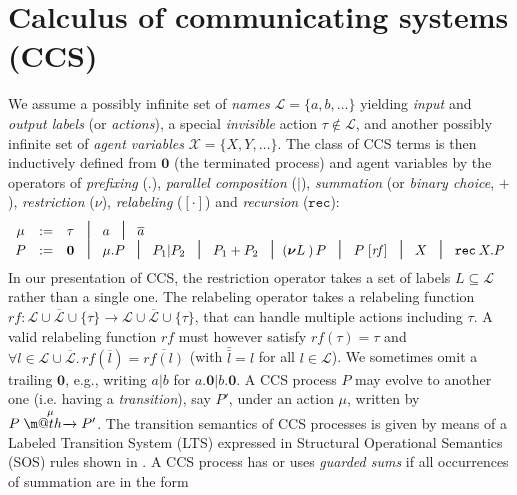 \documentclass[GCNS]{yincog}
\makeatletter
\def \rightarrowfill{$\m@th\mathord{\smash-}\mkern-6mu%
  \cleaders\hbox{$\mkern-2mu\mathord{\smash-}\mkern-2mu$}\hfill
  \mkern-6mu\mathord\rightarrow$}
\theoremstyle{remark}
\theoremstyle{theorem}
\theoremstyle{remark}
\def\nil{{\boldsymbol 0}}
\def\res#1{{\boldsymbol \nu} #1\:}
\newcommand{\outC}[1]{\overline{#1}}
\newcommand{\arr}[1]{\mathrel{\stackrel{{\;\;#1\;\;}}{\mbox{\rightarrowfill}}}}
\def\midd{\; \; \mbox{\Large{$\mid$}}\;\;}
\newcommand{\recu}[2]{\mathtt{rec}\: #1 . #2}
\makeatother
\begin{document}
\section{Calculus of communicating systems (CCS)}
 \label{ss:ccs}

We assume a possibly infinite set of \emph{names}
$\mathscr{L} = \{a, b, \ldots \}$ yielding \emph{input} and
\emph{output labels} (or \emph{actions}), a special \emph{invisible} action
$\tau \notin \mathscr{L}$, and another possibly infinite set of
\emph{agent variables} $\mathscr{X} = \{X, Y, \ldots \}$. The class of CCS
terms is then inductively defined from $\nil $ (the terminated process)
and agent variables by the operators of \emph{prefixing} (.),
\emph{parallel composition} ($|$), \emph{summation} (or
\emph{binary choice}, $+$), \emph{restriction} ($\nu $),
\emph{relabeling} ($[\cdot ]$) and \emph{recursion} ($\texttt{rec}$):
%
\begin{equation*}
%
\begin{array}{cccl}
\mu & := & \tau \!\!\!\! & \midd \; a \; \midd \; \outC a
\\
P & := & \nil \!\!\!\! & \midd \; \mu . P \; \midd \; P_1 | P_2 \;
\midd \; P_1 + P_2 \; \midd (\res L)\, P \; \midd \; P\; [\mathit{rf}]
\; \midd \; X \; \midd \; \recu X P
\end{array}
%
\end{equation*}
%
In our presentation of CCS, the restriction operator takes a set of labels
$L \subseteq \mathscr{L}$ rather than a single one. The relabeling operator
takes a relabeling function
$\mathit{rf} \colon \mathscr{L} \cup \overline{\mathscr{L}} \cup \{
\tau \} \rightarrow \mathscr{L} \cup \overline{\mathscr{L}} \cup \{
\tau \}$, that can handle multiple actions including $\tau $. A valid relabeling
function $\mathit{rf}$ must however satisfy
$\mathit{rf}(\tau ) = \tau $ and
$\forall l\in \mathscr{L} \cup \overline{\mathscr{L}}.\, \mathit{rf}(
\overline{l}) = \overline{\mathit{rf}(l)}$ (with $\bar{\bar l} = l$ for
all $l \in \mathscr{L}$). We sometimes omit a trailing $\nil $, e.g., writing
$a|b$ for $a.\nil |b .\nil $. A CCS process $P$ may evolve to another one
(i.e. having a \emph{transition}), say $P'$, under an action $\mu $, written
by $P \arr{\mu} P'$. The transition semantics of CCS processes is given
by means of a Labeled Transition System (LTS) expressed in Structural Operational
Semantics (SOS) rules shown in . A CCS process has or
uses \emph{guarded sums} if all occurrences of summation are in the form
\end{document}
